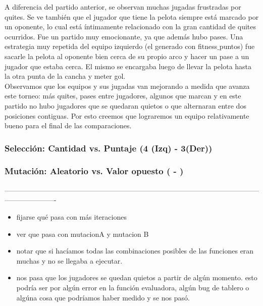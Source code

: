 
A diferencia del partido anterior, se observan muchas jugadas frustradas por quites.
Se ve también que el jugador que tiene la pelota siempre está marcado por un oponente, lo cual está íntimamente relacionado con la gran cantidad de quites ocurridos.
Fue un partido muy emocionante, ya que además hubo pases.
Una estrategia muy repetida del equipo izquierdo (el generado con fitness$\_$puntos) fue sacarle la pelota al oponente bien cerca de su propio arco y hacer un pase a un jugador que estaba cerca.
El mismo se encargaba luego de llevar la pelota hasta la otra punta de la cancha y meter gol.\\

Observamos que los equipos y sus jugadas van mejorando a medida que avanza este torneo: más quites, pases entre jugadores, algunos que marcan y en este partido no hubo jugadores que se quedaran quietos o que alternaran entre dos posiciones contiguas.
Por esto creemos que lograremos un equipo relativamente bueno para el final de las comparaciones.



\subsubsection*{Selección: Cantidad vs. Puntaje (4 (Izq) - 3(Der))}
\subsubsection*{Mutación: Aleatorio vs. Valor opuesto ( - )}

----------------------------------------------------------------------------------------------------------------------------------
\begin{itemize}
    \item fijarse qué pasa con más iteraciones
    \item ver que pasa con mutacionA y mutacion B
    \item notar que si hacíamos todas las combinaciones posibles de las funciones eran muchas y no se llegaba a ejecutar.
    \item nos pasa que los jugadores se quedan quietos a partir de algún momento. esto podría ser por algún error en la función evaluadora, algún bug de tablero o algúna cosa que podríamos haber medido y se nos pasó.
\end{itemize}

